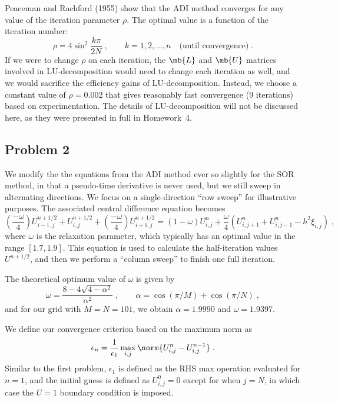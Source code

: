 \documentclass[11pt]{article}
\begin{document}
Peaceman and Rachford (1955) show that the ADI method converges for any value of the iteration parameter $\rho$. The optimal value is a function of the iteration number:
\begin{equation}
\rho = 4 \sin^2 \frac{k \pi}{2 N}
\;, \qquad
k = 1, 2, ..., n \quad \text{(until convergence)}
\;.
\end{equation}
If we were to change $\rho$ on each iteration, the $\mb{L}$ and $\mb{U}$ matrices involved in LU-decomposition would need to change each iteration as well, and we would sacrifice the efficiency gains of LU-decomposition. Instead, we choose a constant value of $\rho = 0.002$ that gives reasonably fast convergence (9 iterations) based on experimentation. The details of LU-decomposition will not be discussed here, as they were presented in full in Homework~4.

\subsection{Problem 2}

We modify the the equations from the ADI method ever so slightly for the SOR method, in that a pseudo-time derivative is never used, but we still sweep in alternating directions. We focus on a single-direction ``row sweep'' for illustrative purposes. The associated central difference equation becomes
\begin{equation}
\left( \frac{-\omega}{4} \right) U_{i-1,j}^{n+1/2}
+ U_{i,j}^{n+1/2}
+ \left( \frac{-\omega}{4} \right) U_{i+1,j}^{n+1/2}
=
\left( 1 - \omega \right) U_{i,j}^n
+ \frac{\omega}{4}
\left(
U_{i,j+1}^{n} + U_{i,j-1}^{n} - h^2 \xi_{i,j}
\right)
\;,
\end{equation}
where $\omega$ is the relaxation parameter, which typically has an optimal value in the range $[1.7,1.9]$. This equation is used to calculate the half-iteration values $U^{n+1/2}$, and then we perform a ``column sweep'' to finish one full iteration.

The theoretical optimum value of $\omega$ is given by
\begin{equation}
\omega = \frac{8 - 4 \sqrt{4 - \alpha^2}}{\alpha^2}
\;,\qquad
\alpha = \cos(\pi/M) + \cos(\pi/N)
\;,
\end{equation}
and for our grid with $M=N=101$, we obtain $\alpha = 1.9990$ and $\omega = 1.9397$.

We define our convergence criterion based on the maximum norm as
\begin{equation}
\epsilon_n = \frac{1}{\epsilon_1} \max_{i,j} \norm{U_{i,j}^{n} - U_{i,j}^{n-1}}
\;.
\end{equation}
Similar to the first problem, $\epsilon_1$ is defined as the RHS max operation evaluated for $n=1$, and the initial guess is defined as $U_{i,j}^0 = 0$ except for when $j=N$, in which case the $U=1$ boundary condition is imposed.
\end{document}
